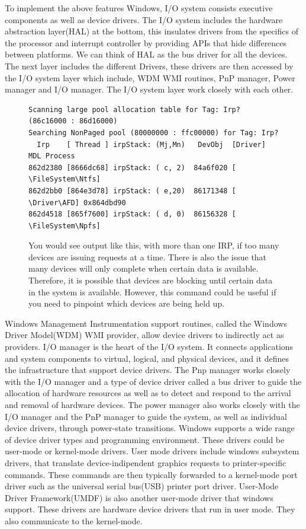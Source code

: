 \documentclass[letterpaper,10pt,draftclsnofoot,onecolumn]{IEEEtran}
\begin{document}
To implement the above features Windows, I/O system consists executive components as well as device drivers.
The I/O system includes the hardware abstraction layer(HAL) at the bottom, this insulates drivers from the specifics of the processor and interrupt controller by providing APIs that hide differences between platforms. We can think of HAL as the bus driver for all the devices. The next layer includes the different Drivers, these drivers are then accessed by the I/O system layer which include, WDM WMI routines, PnP manager, Power manager and I/O manager.
The I/O system layer work closely with each other.
\begin{figure}[H]
\caption{You would see output like this, with more than one IRP, if too many devices are issuing requests at a time. There is also the issue that many devices will only complete when certain data is available. Therefore, it is possible that devices are blocking until certain data in the system is available. However, this command could be useful if you need to pinpoint which devices are being held up.}
\begin{lstlisting}
Scanning large pool allocation table for Tag: Irp? (86c16000 : 86d16000)
Searching NonPaged pool (80000000 : ffc00000) for Tag: Irp?
  Irp    [ Thread ] irpStack: (Mj,Mn)   DevObj  [Driver]         MDL Process
862d2380 [8666dc68] irpStack: ( c, 2)  84a6f020 [ \FileSystem\Ntfs]
862d2bb0 [864e3d78] irpStack: ( e,20)  86171348 [ \Driver\AFD] 0x864dbd90
862d4518 [865f7600] irpStack: ( d, 0)  86156328 [ \FileSystem\Npfs]
\end{lstlisting}
\end{figure}
Windows Management Instrumentation support routines, called the Windows Driver Model(WDM) WMI provider, allow device drivers to indirectly act as providers. I/O manager is the heart of the I/O system. It connects applications and system components to virtual, logical, and physical devices, and it defines the infrastructure that support device drivers. The Pnp manager works closely with the I/O manager and a type of device driver called a bus driver to guide the allocation of hardware resources as well as to detect and respond to the arrival and removal of hardware devices. The power manager also works closely with the I/O manager and the PnP manager to guide the system, as well as individual device drivers, through power-state transitions.
Windows supports a wide range of device driver types and programming environment. These drivers could be user-mode or kernel-mode drivers.
User mode drivers include windows subsystem drivers, that translate device-indipendent graphics requests to printer-specific commands. These commands are then typically forwarded to a kernel-mode port driver such as the universal serial bus(USB) printer port driver. User-Mode Driver Framework(UMDF) is also another user-mode driver that windows support. These drivers are hardware device drivers that run in user mode. They also communicate to the kernel-mode. 
\end{document}
